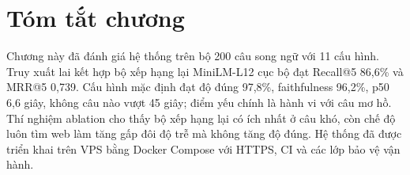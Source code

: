 \section{Tóm tắt chương}
\label{sec:ch4_summary}

Chương này đã đánh giá hệ thống trên bộ 200 câu song ngữ với 11 cấu hình. Truy xuất lai kết hợp bộ xếp hạng lại MiniLM-L12 cục bộ đạt Recall@5 86,6\% và MRR@5 0,739. Cấu hình mặc định đạt độ đúng 97,8\%, faithfulness 96,2\%, p50 6,6 giây, không câu nào vượt 45 giây; điểm yếu chính là hành vi với câu mơ hồ. Thí nghiệm ablation cho thấy bộ xếp hạng lại có ích nhất ở câu khó, còn chế độ luôn tìm web làm tăng gấp đôi độ trễ mà không tăng độ đúng. Hệ thống đã được triển khai trên VPS bằng Docker Compose với HTTPS, CI và các lớp bảo vệ vận hành.
